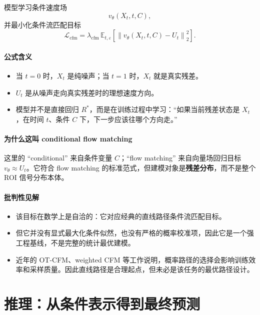 \documentclass[11pt,a4paper]{ctexart}
\newcommand{\E}{\mathbb{E}}
\begin{document}
模型学习条件速度场
\begin{equation}
v_\theta(X_t, t, C),
\end{equation}
并最小化条件流匹配目标
\begin{equation}
\mathcal{L}_{\mathrm{cfm}}
=
\lambda_{\mathrm{cfm}}\,
\E_{t,\varepsilon}
\left[
\left\|
v_\theta(X_t,t,C) - U_t
\right\|_2^2
\right].
\end{equation}

\paragraph{公式含义}
\begin{itemize}
  \item 当 $t=0$ 时，$X_t$ 是纯噪声；当 $t=1$ 时，$X_t$ 就是真实残差。
  \item $U_t$ 是从噪声走向真实残差时的理想速度方向。
  \item 模型并不是直接回归 $R^{*}$，而是在训练过程中学习：``如果当前残差状态是 $X_t$，在时间 $t$、条件 $C$ 下，下一步应该往哪个方向走。''
\end{itemize}

\paragraph{为什么这叫 conditional flow matching}
这里的 ``conditional'' 来自条件变量 $C$；``flow matching'' 来自向量场回归目标 $v_\theta \approx U_t$。它符合 flow matching 的标准范式，但建模对象是\textbf{残差分布}，而不是整个 ROI 信号分布本体。

\paragraph{批判性见解}
\begin{itemize}
  \item 该目标在数学上是自洽的：它对应经典的直线路径条件流匹配目标。
  \item 但它并没有显式最大化条件似然，也没有严格的概率校准项，因此它是一个强工程基线，不是完整的统计最优建模。
  \item 近年的 OT-CFM、weighted CFM 等工作说明，概率路径的选择会影响训练效率和采样质量。因此直线路径是合理起点，但未必是该任务的最优路径设计。
\end{itemize}

\section{推理：从条件表示得到最终预测}
\end{document}
